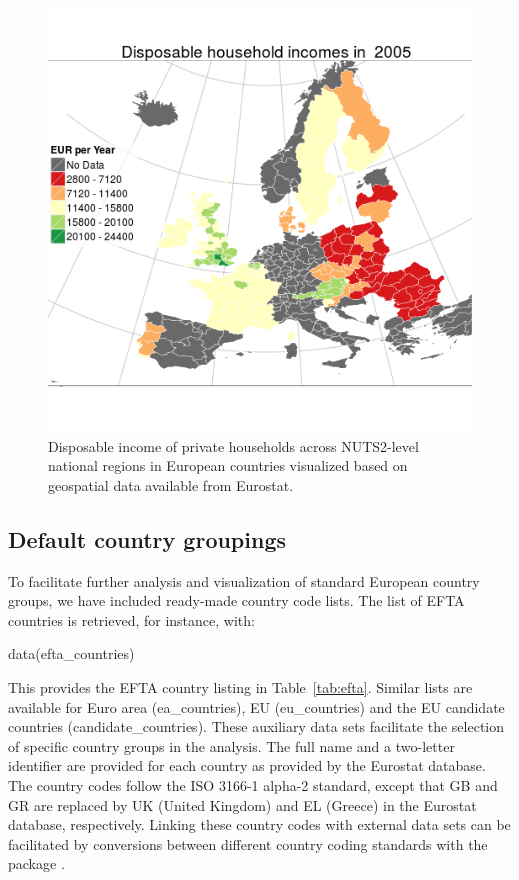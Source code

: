 \begin{figure}
\begin{center}
\includegraphics{2015-manu-mapexample-1}
\caption{Disposable income of private households across NUTS2-level national regions in European countries visualized based on geospatial data available from Eurostat.}
\label{fig:mapexample}
\end{center}
\end{figure}


\subsection{Default country groupings}

To facilitate further analysis and visualization of standard European
country groups, we have included ready-made country code lists. The
list of EFTA countries is retrieved, for instance, with:

\begin{example}
data(efta_countries)
\end{example}


This provides the EFTA country listing in
Table~\ref{tab:efta}. Similar lists are available for Euro area
(ea\_countries), EU (eu\_countries) and the EU candidate countries
(candidate\_countries). These auxiliary data sets facilitate the
selection of specific country groups in the analysis. The full name
and a two-letter identifier are provided for each country as provided
by the Eurostat database. The country codes follow the ISO 3166-1
alpha-2 standard, except that GB and GR are replaced by UK (United
Kingdom) and EL (Greece) in the Eurostat database,
respectively. Linking these country codes with external data sets can
be facilitated by conversions between different country coding
standards with the  package \citep{countrycode}.

